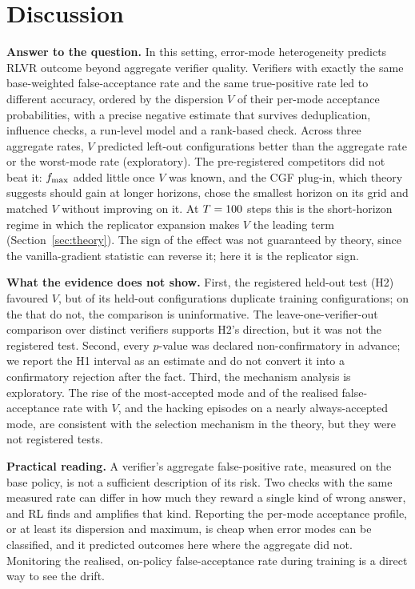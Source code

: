 \section{Discussion}\label{sec:discussion}
\textbf{Answer to the question.} In this setting, error-mode heterogeneity predicts RLVR outcome beyond aggregate verifier quality. Verifiers with exactly the same base-weighted false-acceptance rate and the same true-positive rate led to different accuracy, ordered by the dispersion $V$ of their per-mode acceptance probabilities, with a precise negative estimate that survives deduplication, influence checks, a run-level model and a rank-based check. Across three aggregate rates, $V$ predicted left-out configurations better than the aggregate rate or the worst-mode rate (exploratory). The pre-registered competitors did not beat it: $f_{\max}$ added little once $V$ was known, and the CGF plug-in, which theory suggests should gain at longer horizons, chose the smallest horizon on its grid and matched $V$ without improving on it. At $T=100$ steps this is the short-horizon regime in which the replicator expansion makes $V$ the leading term (Section~\ref{sec:theory}). The sign of the effect was not guaranteed by theory, since the vanilla-gradient statistic can reverse it; here it is the replicator sign.

\textbf{What the evidence does not show.} First, the registered held-out test (H2) favoured $V$, but \NheldTwin{} of its \NheldOut{} held-out configurations duplicate training configurations; on the \PureN{} that do not, the comparison is uninformative. The leave-one-verifier-out comparison over distinct verifiers supports H2's direction, but it was not the registered test. Second, every $p$-value was declared non-confirmatory in advance; we report the H1 interval as an estimate and do not convert it into a confirmatory rejection after the fact. Third, the mechanism analysis is exploratory. The rise of the most-accepted mode and of the realised false-acceptance rate with $V$, and the hacking episodes on a nearly always-accepted mode, are consistent with the selection mechanism in the theory, but they were not registered tests.

\textbf{Practical reading.} A verifier's aggregate false-positive rate, measured on the base policy, is not a sufficient description of its risk. Two checks with the same measured rate can differ in how much they reward a single kind of wrong answer, and RL finds and amplifies that kind. Reporting the per-mode acceptance profile, or at least its dispersion and maximum, is cheap when error modes can be classified, and it predicted outcomes here where the aggregate did not. Monitoring the realised, on-policy false-acceptance rate during training is a direct way to see the drift.

